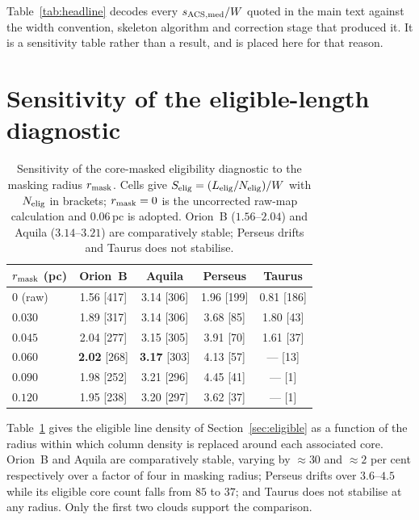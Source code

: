 \documentclass[usenatbib,twoside,twocolumn]{mnras}
\begin{document}
Table~\ref{tab:headline} decodes every $s_{\rm ACS,med}/W$ quoted in the main text against the width convention, skeleton algorithm and correction stage that produced it. It is a sensitivity table rather than a result, and is placed here for that reason.

\section{Sensitivity of the eligible-length diagnostic}
\label{sec:maskapp}

\begin{table}
\caption{Sensitivity of the core-masked eligibility diagnostic to the masking radius $r_{\rm mask}$. Cells give $S_{\rm elig}=(L_{\rm elig}/N_{\rm elig})/W$ with $N_{\rm elig}$ in brackets; $r_{\rm mask}=0$ is the uncorrected raw-map calculation and $0.06$\,pc is adopted. Orion~B ($1.56$--$2.04$) and Aquila ($3.14$--$3.21$) are comparatively stable; Perseus drifts and Taurus does not stabilise.}
\label{tab:maskrad}
\footnotesize
\setlength{\tabcolsep}{4pt}
\begin{tabular}{lcccc}
\toprule
$r_{\rm mask}$ (pc) & Orion~B & Aquila & Perseus & Taurus \\
\midrule
$0$ (raw) & 1.56 [417] & 3.14 [306] & 1.96 [199] & 0.81 [186] \\
$0.030$   & 1.89 [317] & 3.14 [306] & 3.68 [85]  & 1.80 [43] \\
$0.045$   & 2.04 [277] & 3.15 [305] & 3.91 [70]  & 1.61 [37] \\
$0.060$   & \textbf{2.02} [268] & \textbf{3.17} [303] & 4.13 [57] & --- [13] \\
$0.090$   & 1.98 [252] & 3.21 [296] & 4.45 [41]  & --- [1] \\
$0.120$   & 1.95 [238] & 3.20 [297] & 3.62 [37]  & --- [1] \\
\bottomrule
\end{tabular}
\end{table}

Table~\ref{tab:maskrad} gives the eligible line density of Section~\ref{sec:eligible} as a function of the radius within which column density is replaced around each associated core. Orion~B and Aquila are comparatively stable, varying by $\approx30$ and $\approx2$ per cent respectively over a factor of four in masking radius; Perseus drifts over $3.6$--$4.5$ while its eligible core count falls from $85$ to $37$; and Taurus does not stabilise at any radius. Only the first two clouds support the comparison.
\end{document}
